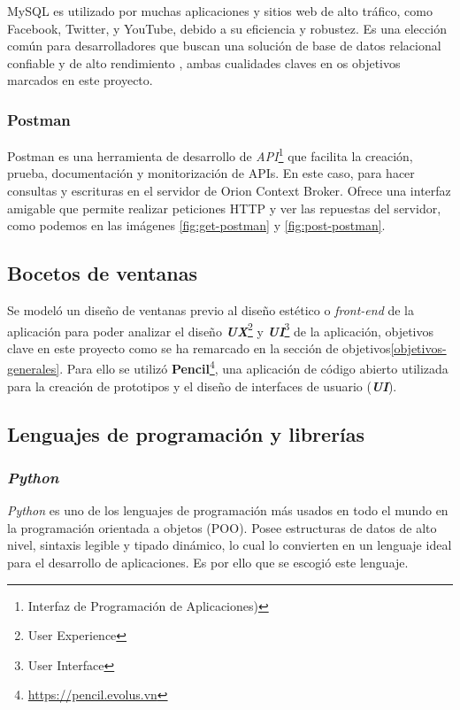 MySQL es utilizado por muchas aplicaciones y sitios web de alto tráfico, como Facebook, Twitter, y YouTube, debido a su eficiencia y robustez. Es una elección común para desarrolladores que buscan una solución de base de datos relacional confiable y de alto rendimiento \cite{mysqlcookbook}, ambas cualidades claves en os objetivos marcados en este proyecto.

\subsubsection{Postman}\label{postman}

Postman es una herramienta de desarrollo de \textit{API}\footnote{Interfaz de Programación de Aplicaciones)} que facilita la creación, prueba, documentación y monitorización de APIs. En este caso, para hacer consultas y escrituras en el servidor de Orion Context Broker. Ofrece una interfaz amigable que permite realizar peticiones HTTP y ver las repuestas del servidor, como podemos en las imágenes \ref{fig:get-postman} y \ref{fig:post-postman}.

\subsection{Bocetos de ventanas}

Se modeló un diseño de ventanas previo al diseño estético o \textit{front-end} de la aplicación para poder analizar el diseño \textbf{\textit{UX}}\footnote{User Experience} y \textbf{\textit{UI}}\footnote{User Interface} de la aplicación, objetivos clave en este proyecto como se ha remarcado en la sección de objetivos\ref{objetivos-generales}. Para ello se utilizó \textbf{Pencil}\footnote{\url{https://pencil.evolus.vn}}, una aplicación de código abierto utilizada para la creación de prototipos y el diseño de interfaces de usuario (\textbf{\textit{UI}}).


\subsection{Lenguajes de programación y librerías}

\subsubsection{\textit{Python}}
\textit{Python} es uno de los lenguajes de programación más usados en todo el mundo en la programación orientada a objetos (POO). Posee estructuras de datos de alto nivel, sintaxis legible y tipado dinámico, lo cual lo convierten en un lenguaje ideal para el desarrollo de aplicaciones. Es por ello que se escogió este lenguaje.\cite{python}


